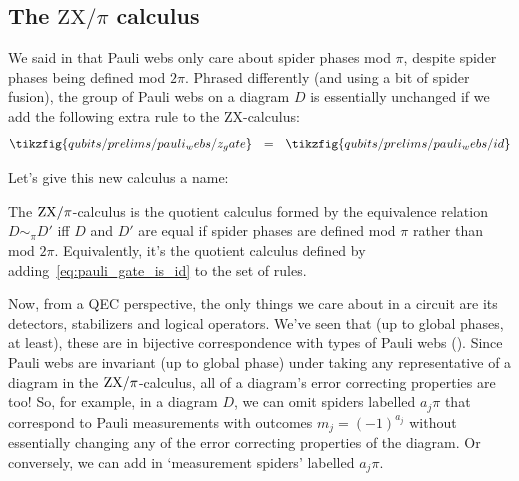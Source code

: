 \subsection{The $\text{ZX}/\pi$ calculus}\label{subsec:zx_mod_pi}

We said in  that Pauli webs only care about spider phases mod $\pi$, despite spider phases being defined mod $2\pi$.
Phrased differently (and using a bit of spider fusion), the group of Pauli webs on a diagram $D$ is essentially unchanged if we add the following extra rule to the ZX-calculus:
\begin{equation}\label{eq:pauli_gate_is_id}
    \tikzfig{qubits/prelims/pauli_webs/z_gate} ~~=~~ \tikzfig{qubits/prelims/pauli_webs/id}
\end{equation}

Let's give this new calculus a name:
\begin{definition}\label{defn:zx_mod_pi}
    The $\text{ZX}/\pi$-calculus is the quotient calculus formed by the equivalence relation $D \sim_\pi D'$ iff $D$ and $D'$ are equal if spider phases are defined mod $\pi$ rather than mod $2\pi$.
    Equivalently, it's the quotient calculus defined by adding~\eqref{eq:pauli_gate_is_id} to the set of rules.
\end{definition}

Now, from a QEC perspective, the only things we care about in a circuit are its detectors, stabilizers and logical operators.
We've seen that (up to global phases, at least), these are in bijective correspondence with types of Pauli webs ().
Since Pauli webs are invariant (up to global phase) under taking any representative of a diagram in the $\text{ZX}/\pi$-calculus, all of a diagram's error correcting properties are too!
So, for example, in a diagram $D$, we can omit spiders labelled $a_j\pi$ that correspond to Pauli measurements with outcomes $m_j = (-1)^{a_j}$ without essentially changing any of the error correcting properties of the diagram.
Or conversely, we can add in `measurement spiders' labelled $a_j\pi$.